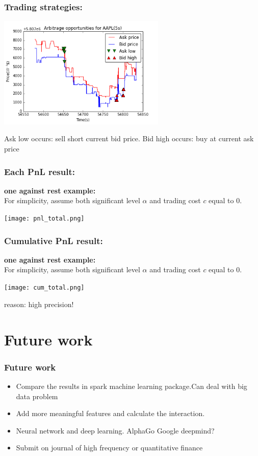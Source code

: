 \documentclass[xcolor={x11names,svgnames,dvipsnames}]{beamer}
\begin{document}
\begin{frame}
\frametitle{Trading strategies:}


\begin{center}
     \includegraphics[width=0.6\textwidth, height=0.6\textheight]{arbitrage_plot.png}
\end{center}    
Ask low occurs: sell short current bid price. Bid high occurs: buy at current ask price
\end{frame}


\begin{frame}
\frametitle{Each PnL result:}
\textbf{one against rest example:}\\
For simplicity, assume both significant level $\alpha$ and trading cost $c$ equal to 0.
\begin{center}
     \texttt{[image: pnl\_total.png]}
\end{center}    

\end{frame}

\begin{frame}
\frametitle{Cumulative PnL result:}
\textbf{one against rest example:}\\
For simplicity, assume both significant level $\alpha$ and trading cost $c$ equal to 0.
\begin{center}
     \texttt{[image: cum\_total.png]}
\end{center}    
\alert{reason: high precision!}
\end{frame}



\section{Future work}
\begin{frame}
\frametitle{Future work}
    \begin{itemize}
        \item  Compare the results in spark machine learning package.Can deal with big data problem 
        \item  Add more meaningful features and calculate the interaction.
        \item  Neural network and deep learning.  AlphaGo Google deepmind?
        \item  Submit on journal of high frequency or quantitative finance 
      \end{itemize}
\end{frame}
\end{document}
